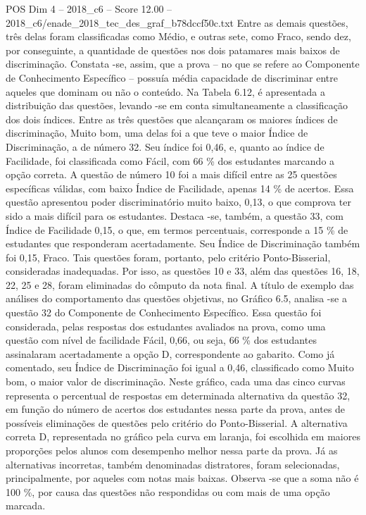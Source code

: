 \begin{textsample}{POS Dim 4 – 2018\_c6 – Score 12.00 – 2018\_c6/enade\_2018\_tec\_des\_graf\_b78dccf50c.txt}
Entre as demais questões, três delas foram classificadas como Médio, e outras sete, como Fraco, sendo dez, por conseguinte, a quantidade de questões nos dois patamares mais baixos de discriminação.
Constata -se, assim, que a prova – no que se refere ao Componente de Conhecimento Específico – possuía média capacidade de discriminar entre aqueles que dominam ou não o conteúdo.
Na Tabela 6.12, é apresentada a distribuição das questões, levando -se em conta simultaneamente a classificação dos dois índices.
Entre as três questões que alcançaram os maiores índices de discriminação, Muito bom, uma delas foi a que teve o maior Índice de Discriminação, a de número 32.
Seu índice foi 0,46, e, quanto ao índice de Facilidade, foi classificada como Fácil, com 66 \% dos estudantes marcando a opção correta.
A questão de número 10 foi a mais difícil entre as 25 questões específicas válidas, com baixo Índice de Facilidade, apenas 14 \% de acertos.
Essa questão apresentou poder discriminatório muito baixo, 0,13, o que comprova ter sido a mais difícil para os estudantes.
Destaca -se, também, a questão 33, com Índice de Facilidade 0,15, o que, em termos percentuais, corresponde a 15 \% de estudantes que responderam acertadamente.
Seu Índice de Discriminação também foi 0,15, Fraco.
Tais questões foram, portanto, pelo critério Ponto-Bisserial, consideradas inadequadas.
Por isso, as questões 10 e 33, além das questões 16, 18, 22, 25 e 28, foram eliminadas do cômputo da nota final.
A título de exemplo das análises do comportamento das questões objetivas, no Gráfico 6.5, analisa -se a questão 32 do Componente de Conhecimento Específico.
Essa questão foi considerada, pelas respostas dos estudantes avaliados na prova, como uma questão com nível de facilidade Fácil, 0,66, ou seja, 66 \% dos estudantes assinalaram acertadamente a opção D, correspondente ao gabarito.
Como já comentado, seu Índice de Discriminação foi igual a 0,46, classificado como Muito bom, o maior valor de discriminação.
Neste gráfico, cada uma das cinco curvas representa o percentual de respostas em determinada alternativa da questão 32, em função do número de acertos dos estudantes nessa parte da prova, antes de possíveis eliminações de questões pelo critério do Ponto-Bisserial.
A alternativa correta D, representada no gráfico pela curva em laranja, foi escolhida em maiores proporções pelos alunos com desempenho melhor nessa parte da prova.
Já as alternativas incorretas, também denominadas distratores, foram selecionadas, principalmente, por aqueles com notas mais baixas.
Observa -se que a soma não é 100 \%, por causa das questões não respondidas ou com mais de uma opção marcada.

\end{textsample}
